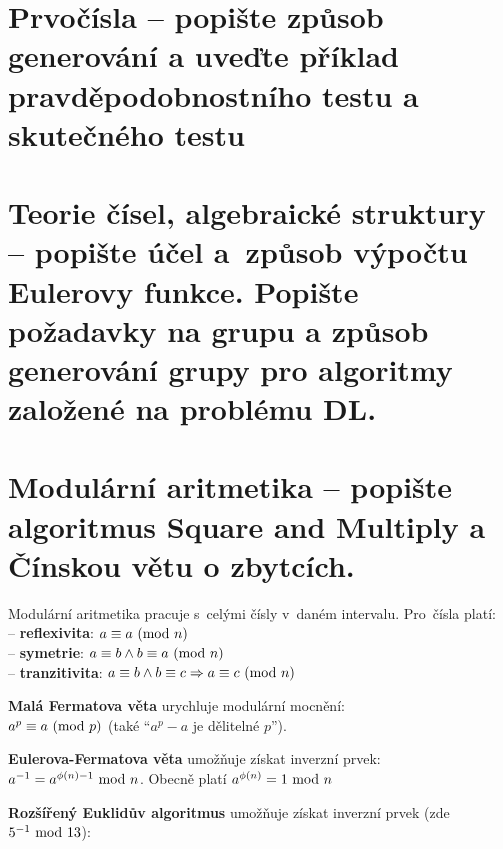 \section{Prvočísla -- popište způsob generování a uveďte příklad pravděpodobnostního testu a skutečného testu}

\clearpage
\section{Teorie čísel, algebraické struktury -- popište účel a~způsob výpočtu Eulerovy funkce. Popište požadavky na grupu a způsob generování grupy pro algoritmy založené na problému DL.}

\clearpage
\section{Modulární aritmetika -- popište algoritmus Square and Multiply a Čínskou větu o zbytcích.}

Modulární aritmetika pracuje s~celými čísly v~daném intervalu. Pro~čísla platí: \\
-- \textbf{reflexivita}: $a \equiv a \ (\mathrm{mod}\ n)$ \\
-- \textbf{symetrie}: $a \equiv b \wedge b \equiv a \ (\mathrm{mod}\ n)$ \\
-- \textbf{tranzitivita}: $a \equiv b \wedge b \equiv c \Rightarrow a \equiv c \ (\mathrm{mod}\ n)$

\vspace*{1em} \noindent
\textbf{Malá Fermatova věta} urychluje modulární mocnění: \\
$a^p \equiv a \ (\mathrm{mod}\ p)$ (také \enquote{$a^p - a$ je dělitelné $p$}).

\vspace*{1em} \noindent
\textbf{Eulerova-Fermatova věta} umožňuje získat inverzní prvek: \\
$a^{-1} = a^{\phi(n) - 1} \ \mathrm{mod}\ n$. Obecně platí $a^{\phi(n)} = 1 \ \mathrm{mod}\ n$

\vspace*{1em} \noindent
\textbf{Rozšířený Euklidův algoritmus} umožňuje získat inverzní prvek (zde $5^{-1} \ \mathrm{mod}\ 13$):

